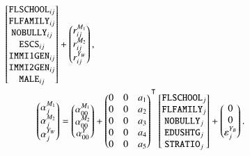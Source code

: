 \begin{equation}
\begin{aligned}
\begin{bmatrix}
            \texttt{FLSCHOOL}_{ij}\\
            \texttt{FLFAMILY}_{ij}\\
            \texttt{NOBULLY}_{ij}\\
            \texttt{ESCS}_{ij}\\
            \texttt{IMMI1GEN}_{ij}\\
            \texttt{IMMI2GEN}_{ij}\\
            \texttt{MALE}_{ij}
        \end{bmatrix} +
        \begin{pmatrix}
            r^{M_1}_{ij}\\
            r^{M_2}_{ij}\\
            r^{Y_W}_{ij}
        \end{pmatrix},\\
        \begin{pmatrix}
            \alpha^{M_1}_{j}\\
            \alpha^{M_2}_{j}\\
            \alpha^{Y_W}_{j}\\
        \end{pmatrix} =
        \begin{pmatrix}
            \alpha^{M_1}_{00}\\
            \alpha^{M_2}_{00}\\
            \alpha^Y_{00}
        \end{pmatrix} &+
        \begin{pmatrix}
            0   &0  &a_1\\
            0   &0  &a_2\\
            0   &0  &a_3\\
            0   &0  &a_4\\
            0   &0  &a_5
        \end{pmatrix}\Ts
        \begin{bmatrix}
            \texttt{FLSCHOOL}_j\\
            \texttt{FLFAMILY}_j\\
            \texttt{NOBULLY}_j\\
            \texttt{EDUSHTG}_j\\
            \texttt{STRATIO}_j
        \end{bmatrix} +
        \begin{pmatrix}
            0\\
            0\\
            \epsilon^{Y_B}_j
        \end{pmatrix}.
    \end{aligned}
\end{equation}

